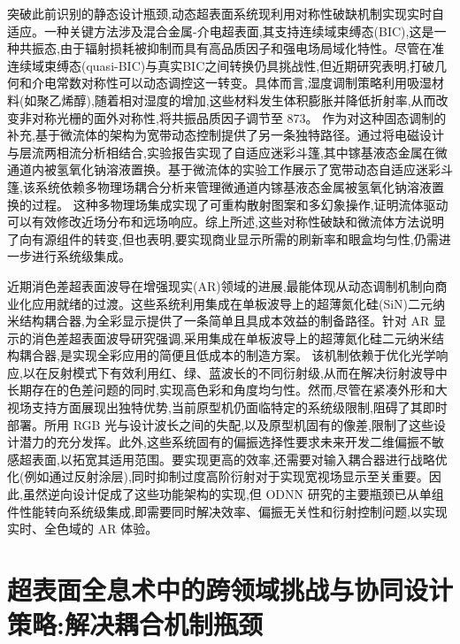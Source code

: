 突破此前识别的静态设计瓶颈,动态超表面系统现利用对称性破缺机制实现实时自适应。一种关键方法涉及混合金属-介电超表面,其支持连续域束缚态(BIC),这是一种共振态,由于辐射损耗被抑制而具有高品质因子和强电场局域化特性。尽管在准连续域束缚态(quasi-BIC)与真实BIC之间转换仍具挑战性,但近期研究表明,打破几何和介电常数对称性可以动态调控这一转变。具体而言,湿度调制策略利用吸湿材料(如聚乙烯醇),随着相对湿度的增加,这些材料发生体积膨胀并降低折射率,从而改变非对称光栅的面外对称性,将共振品质因子调节至 873。\citep{doi_10_1002_adpr_202400191_88f03cd9} \citep{doi_10_1364_oe_574568_72469f3c} 作为对这种固态调制的补充,基于微流体的架构为宽带动态控制提供了另一条独特路径。通过将电磁设计与层流两相流分析相结合,实验报告实现了自适应迷彩斗篷,其中镓基液态金属在微通道内被氢氧化钠溶液置换。基于微流体的实验工作展示了宽带动态自适应迷彩斗篷,该系统依赖多物理场耦合分析来管理微通道内镓基液态金属被氢氧化钠溶液置换的过程。\citep{doi_10_1002_lpor_202500327_a3bf6deb} 这种多物理场集成实现了可重构散射图案和多幻象操作,证明流体驱动可以有效修改近场分布和远场响应。综上所述,这些对称性破缺和微流体方法说明了向有源组件的转变,但也表明,要实现商业显示所需的刷新率和眼盒均匀性,仍需进一步进行系统级集成。\citep{doi_10_1002_adpr_202400191_88f03cd9} \citep{doi_10_1002_lpor_202500327_a3bf6deb}

近期消色差超表面波导在增强现实(AR)领域的进展,最能体现从动态调制机制向商业化应用就绪的过渡。这些系统利用集成在单板波导上的超薄氮化硅(SiN)二元纳米结构耦合器,为全彩显示提供了一条简单且具成本效益的制备路径。针对 AR 显示的消色差超表面波导研究强调,采用集成在单板波导上的超薄氮化硅二元纳米结构耦合器,是实现全彩应用的简便且低成本的制造方案。\citep{doi_10_1038_s41377_025_01761_w_a73a6b84} 该机制依赖于优化光学响应,以在反射模式下有效利用红、绿、蓝波长的不同衍射级,从而在解决衍射波导中长期存在的色差问题的同时,实现高色彩和角度均匀性。然而,尽管在紧凑外形和大视场支持方面展现出独特优势,当前原型机仍面临特定的系统级限制,阻碍了其即时部署。所用 RGB 光与设计波长之间的失配,以及原型机固有的像差,限制了这些设计潜力的充分发挥。此外,这些系统固有的偏振选择性要求未来开发二维偏振不敏感超表面,以拓宽其适用范围。要实现更高的效率,还需要对输入耦合器进行战略优化(例如通过反射涂层),同时抑制过度高阶衍射对于实现宽视场显示至关重要。因此,虽然逆向设计促成了这些功能架构的实现,但 ODNN 研究的主要瓶颈已从单组件性能转向系统级集成,即需要同时解决效率、偏振无关性和衍射控制问题,以实现实时、全色域的 AR 体验。\citep{doi_10_1038_s41377_025_01761_w_a73a6b84}

\section{超表面全息术中的跨领域挑战与协同设计策略:解决耦合机制瓶颈}\label{ux8d85ux8868ux9762ux5168ux606fux672fux4e2dux7684ux8de8ux9886ux57dfux6311ux6218ux4e0eux534fux540cux8bbeux8ba1ux7b56ux7565ux89e3ux51b3ux8026ux5408ux673aux5236ux74f6ux9888}

